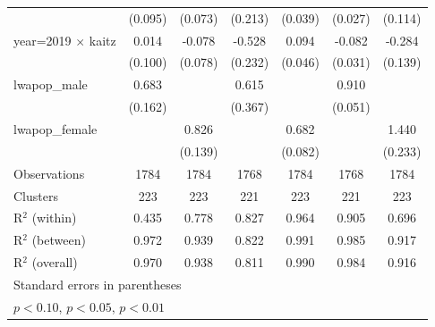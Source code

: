 {\begin{tabular}{l*{6}{c}}
                    &     (0.095)         &     (0.073)         &     (0.213)         &     (0.039)         &     (0.027)         &     (0.114)         \\
[1em]
year=2019 $\times$ kaitz&       0.014         &      -0.078         &      -0.528\sym{**} &       0.094\sym{**} &      -0.082\sym{***}&      -0.284\sym{**} \\
                    &     (0.100)         &     (0.078)         &     (0.232)         &     (0.046)         &     (0.031)         &     (0.139)         \\
[1em]
lwapop\_male         &       0.683\sym{***}&                     &       0.615\sym{*}  &                     &       0.910\sym{***}&                     \\
                    &     (0.162)         &                     &     (0.367)         &                     &     (0.051)         &                     \\
[1em]
lwapop\_female       &                     &       0.826\sym{***}&                     &       0.682\sym{***}&                     &       1.440\sym{***}\\
                    &                     &     (0.139)         &                     &     (0.082)         &                     &     (0.233)         \\
\hline
Observations        &        1784         &        1784         &        1768         &        1784         &        1768         &        1784         \\
Clusters            &         223         &         223         &         221         &         223         &         221         &         223         \\
R$^2$ (within)      &       0.435         &       0.778         &       0.827         &       0.964         &       0.905         &       0.696         \\
R$^2$ (between)     &       0.972         &       0.939         &       0.822         &       0.991         &       0.985         &       0.917         \\
R$^2$ (overall)     &       0.970         &       0.938         &       0.811         &       0.990         &       0.984         &       0.916         \\
\hline\hline
\multicolumn{7}{l}{\footnotesize Standard errors in parentheses}\\
\multicolumn{7}{l}{\footnotesize \sym{*} \(p<0.10\), \sym{**} \(p<0.05\), \sym{***} \(p<0.01\)}\\
\end{tabular}
}
